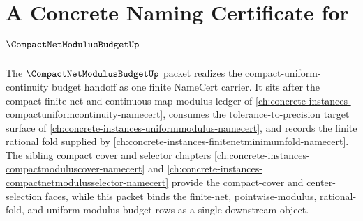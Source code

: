 \chapter{A Concrete Naming Certificate for $\CompactNetModulusBudgetUp$}
\label{ch:concrete-instances-compactnetmodulusbudget-namecert}

The $\CompactNetModulusBudgetUp$ packet realizes the compact-uniform-continuity budget handoff as one finite NameCert carrier. It sits after the compact finite-net and continuous-map modulus ledger of \autoref{ch:concrete-instances-compactuniformcontinuity-namecert}, consumes the tolerance-to-precision target surface of \autoref{ch:concrete-instances-uniformmodulus-namecert}, and records the finite rational fold supplied by \autoref{ch:concrete-instances-finitenetminimumfold-namecert}. The sibling compact cover and selector chapters \autoref{ch:concrete-instances-compactmoduluscover-namecert} and \autoref{ch:concrete-instances-compactnetmodulusselector-namecert} provide the compact-cover and center-selection faces, while this packet binds the finite-net, pointwise-modulus, rational-fold, and uniform-modulus budget rows as a single downstream object.

